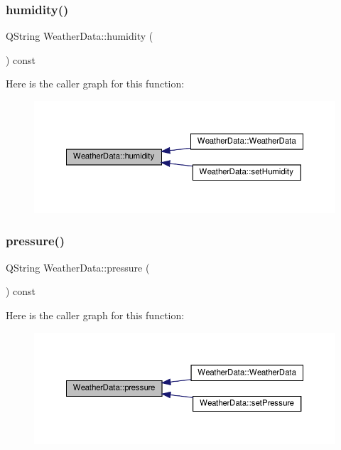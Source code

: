 \subsubsection{\texorpdfstring{humidity()}{humidity()}}
{\footnotesize\ttfamily Q\+String Weather\+Data\+::humidity (\begin{DoxyParamCaption}{ }\end{DoxyParamCaption}) const}

Here is the caller graph for this function\+:
\nopagebreak
\begin{figure}[H]
\begin{center}
\leavevmode
\includegraphics[width=350pt]{class_weather_data_a0a83b2ee5398eaba062e3c6fe9264a3d_icgraph}
\end{center}
\end{figure}
\mbox{\label{class_weather_data_af726e713890bd6d310fe4a718dd69c77}} 
\subsubsection{\texorpdfstring{pressure()}{pressure()}}
{\footnotesize\ttfamily Q\+String Weather\+Data\+::pressure (\begin{DoxyParamCaption}{ }\end{DoxyParamCaption}) const}

Here is the caller graph for this function\+:
\nopagebreak
\begin{figure}[H]
\begin{center}
\leavevmode
\includegraphics[width=350pt]{class_weather_data_af726e713890bd6d310fe4a718dd69c77_icgraph}
\end{center}
\end{figure}
\mbox{\label{class_weather_data_ab47f3e7cde6cf4d93dfb1750ac014f00}} 
